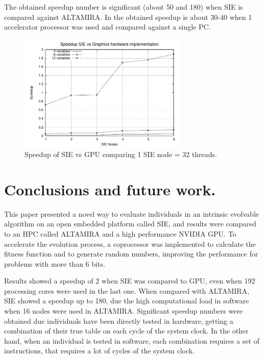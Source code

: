\documentclass{sig-alternate}
\begin{document}
The obtained speedup number is significant (about 50 and 180) when SIE is compared against ALTAMIRA. In \cite{SEKANINA2008, ABYSEK2010} the obtained speedup is about 30-40 when 1 accelerator processor was used and compared against a single PC.

\begin{figure}[h!]
\begin{center} 
\includegraphics[width=8cm]{./images/speedup_sie_vs_cuda} 
\end{center}
\caption{Speedup of SIE vs GPU comparing 1 SIE node = 32 threads.}
\label{fig:speedup2}
\end{figure}




\section{Conclusions and future work.}
This paper presented a novel way to evaluate individuals in an intrinsic evolvable algorithm on an open embedded platform called SIE, and results were compared to an HPC called ALTAMIRA and a high performance NVIDIA GPU. To accelerate the evolution process, a coprocessor was implemented to calculate the fitness function and to generate random numbers, improving the performance for problems with more than 6 bits. 

Results showed a speedup of 2 when SIE was compared to GPU, even when 192 processing cores were used in the last one. When compared with ALTAMIRA, SIE showed a speedup up to 180, due the high computational load in software when 16 nodes were used in ALTAMIRA. Significant speedup numbers were obtained due individuals have been directly tested in hardware, getting a combination of their true table on each cycle of the system clock. In the other hand, when an individual is tested in software, each combination requires a set of instructions, that requires a lot of cycles of the system clock.
\end{document}

